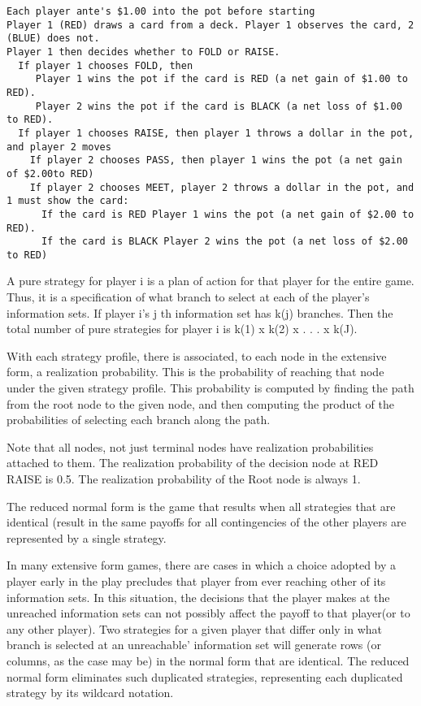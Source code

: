 \documentclass[12pt]{report}
\begin{document}
\begin{helpglossary}
\label{pokergloss}
\begin{verbatim} 
Each player ante's $1.00 into the pot before starting
Player 1 (RED) draws a card from a deck. Player 1 observes the card, 2 (BLUE) does not. 
Player 1 then decides whether to FOLD or RAISE. 
  If player 1 chooses FOLD, then 
     Player 1 wins the pot if the card is RED (a net gain of $1.00 to RED).
     Player 2 wins the pot if the card is BLACK (a net loss of $1.00 to RED).
  If player 1 chooses RAISE, then player 1 throws a dollar in the pot, and player 2 moves
    If player 2 chooses PASS, then player 1 wins the pot (a net gain of $2.00to RED)
    If player 2 chooses MEET, player 2 throws a dollar in the pot, and 1 must show the card: 
      If the card is RED Player 1 wins the pot (a net gain of $2.00 to RED).
      If the card is BLACK Player 2 wins the pot (a net loss of $2.00 to RED)
\end{verbatim}

\label{purestratgloss} 
A pure strategy for player i is a plan of action for that player for the 
entire game.  Thus, it is a specification of what branch to select at each 
of the player's information sets.  If player i's j th information set has 
k(j) branches.  Then the total number of pure strategies for player i is 
k(1) x k(2) x . . . x k(J).

\label{realprobgloss}
With each strategy profile, there is associated, to each node in the 
extensive form, a realization probability.  This is the probability of
 reaching that node under the given strategy profile.  This probability is 
computed by finding the path from the root node to the given node, and then 
computing the product of the probabilities of selecting each branch along 
the path.  

Note that all nodes, not just terminal nodes have realization probabilities
 attached to them.  The realization probability of the decision node at RED 
RAISE is 0.5.  The realization probability of the Root node is always 1.

\label{rednormgloss}
The reduced normal form is the game that results when all strategies that 
are identical (result in  the same payoffs for all contingencies of the 
other players are represented by a single strategy.  

In many extensive form games, there are cases in which a choice adopted by 
a player early in the play precludes that player from ever reaching other 
of its information sets.  In this situation, the decisions that the player 
makes at the unreached information sets can not possibly affect the  payoff
 to that player(or to any other player).  Two strategies for a given player
 that differ only in what branch is selected at an unreachable'  information
 set will generate rows (or columns, as the case may be) in the normal form 
that are identical.  The reduced normal form eliminates such duplicated 
strategies, representing each duplicated strategy by its wildcard notation.  


\end{helpglossary}
\end{document}
